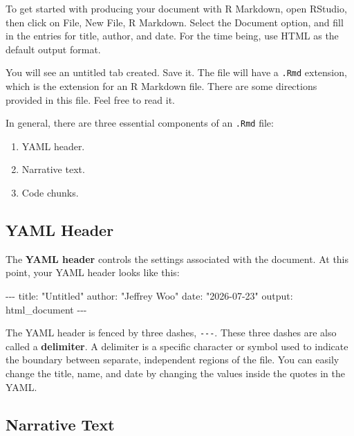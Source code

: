 \documentclass[
]{book}
\newenvironment{Shaded}{\begin{snugshade}}{\end{snugshade}}
\newcommand{\NormalTok}[1]{#1}
\providecommand{\tightlist}{%
  \setlength{\itemsep}{0pt}\setlength{\parskip}{0pt}}
\theoremstyle{definition}
\theoremstyle{definition}
\theoremstyle{definition}
\theoremstyle{definition}
\theoremstyle{remark}
\begin{document}
To get started with producing your document with R Markdown, open RStudio, then click on File, New File, R Markdown. Select the Document option, and fill in the entries for title, author, and date. For the time being, use HTML as the default output format.

You will see an untitled tab created. Save it. The file will have a \texttt{.Rmd} extension, which is the extension for an R Markdown file. There are some directions provided in this file. Feel free to read it.

In general, there are three essential components of an \texttt{.Rmd} file:

\begin{enumerate}
\def\labelenumi{\arabic{enumi}.}
\tightlist
\item
  YAML header.
\item
  Narrative text.
\item
  Code chunks.
\end{enumerate}

\hypertarget{yaml-header}{%
\subsection{YAML Header}\label{yaml-header}}

The \textbf{YAML header} controls the settings associated with the document. At this point, your YAML header looks like this:

\begin{Shaded}
\begin{Highlighting}[]
\NormalTok{{-}{-}{-}}
\NormalTok{title: "Untitled"}
\NormalTok{author: "Jeffrey Woo"}
\NormalTok{date: "2026{-}07{-}23"}
\NormalTok{output: html\_document}
\NormalTok{{-}{-}{-}}
\end{Highlighting}
\end{Shaded}

The YAML header is fenced by three dashes, \texttt{-\/-\/-}. These three dashes are also called a \textbf{delimiter}. A delimiter is a specific character or symbol used to indicate the boundary between separate, independent regions of the file. You can easily change the title, name, and date by changing the values inside the quotes in the YAML.

\hypertarget{narrative-text}{%
\subsection{Narrative Text}\label{narrative-text}}
\end{document}

